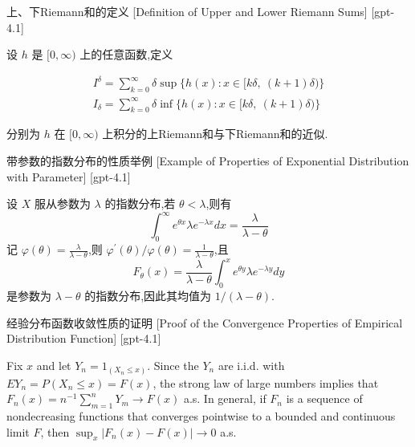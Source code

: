 \documentclass[UTF8]{ctexart}
\begin{document}
    \begin{dfn}
        {上、下Riemann和的定义}
        [Definition of Upper and Lower Riemann Sums]
        [gpt-4.1]
        
设 $h$ 是 $[0,\infty)$ 上的任意函数,定义

\[
\begin{array}{l}
{\displaystyle I^{\delta} = \sum_{k=0}^{\infty} \delta \sup \{ h(x) : x \in [k\delta,\ (k+1)\delta) \}} \\
{\displaystyle I_{\delta} = \sum_{k=0}^{\infty} \delta \inf \{ h(x) : x \in [k\delta,\ (k+1)\delta) \}}
\end{array}
\]

分别为 $h$ 在 $[0,\infty)$ 上积分的上Riemann和与下Riemann和的近似.

    \end{dfn}
    
    
    
    \begin{xmp}
        {带参数的指数分布的性质举例}
        [Example of Properties of Exponential Distribution with Parameter]
        [gpt-4.1]
        
设 $X$ 服从参数为 $\lambda$ 的指数分布,若 $\theta < \lambda$,则有
\[
\int_{ 0 }^{ \infty } e^{ \theta x } \lambda e^{ - \lambda x } dx = \frac{\lambda}{\lambda - \theta}
\]
记 $\varphi( \theta ) = \frac{\lambda}{\lambda - \theta}$,则 $\varphi^{ \prime }( \theta ) / \varphi( \theta ) = \frac{1}{\lambda - \theta}$,且
\[
F_{ \theta }( x ) = \frac{ \lambda }{ \lambda - \theta } \int_{ 0 }^{ x } e^{ \theta y } \lambda e^{ - \lambda y } dy
\]
是参数为 $\lambda - \theta$ 的指数分布,因此其均值为 $1 / (\lambda - \theta)$.

    \end{xmp}
    
    
    
    \begin{prf}
        {经验分布函数收敛性质的证明}
        [Proof of the Convergence Properties of Empirical Distribution Function]
        [gpt-4.1]
        
Fix $x$ and let $Y_{n} = 1_{(X_{n} \leq x)}$. Since the $Y_{n}$ are i.i.d. with $E Y_{n} = P(X_{n} \leq x) = F(x)$, the strong law of large numbers implies that $F_{n}(x) = n^{-1} \sum_{m=1}^{n} Y_{m} \to F(x)$ a.s. In general, if $F_{n}$ is a sequence of nondecreasing functions that converges pointwise to a bounded and continuous limit $F$, then $\operatorname{sup}_{x} |F_{n}(x) - F(x)| \to 0$ a.s.

    \end{prf}
    
\end{document}
